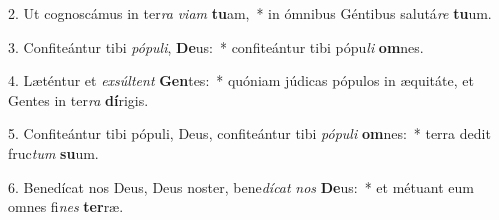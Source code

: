 2. Ut cognoscámus in ter\textit{ra} \textit{vi}\textit{am} \textbf{tu}am,~*  in ómnibus Géntibus salutá\textit{re} \textbf{tu}um.\

3. Confiteántur tibi \textit{pó}\textit{pu}\textit{li}, \textbf{De}us:~*  confiteántur tibi pópu\textit{li} \textbf{om}nes.\

4. Læténtur et \textit{ex}\textit{súl}\textit{tent} \textbf{Gen}tes:~*  quóniam júdicas pópulos in æquitáte, et Gentes in ter\textit{ra} \textbf{dí}rigis.\

5. Confiteántur tibi pópuli, Deus, confiteántur tibi \textit{pó}\textit{pu}\textit{li} \textbf{om}nes:~*  terra dedit fruc\textit{tum} \textbf{su}um.\

6. Benedícat nos Deus, Deus noster, bene\textit{dí}\textit{cat} \textit{nos} \textbf{De}us:~*  et métuant eum omnes fi\textit{nes} \textbf{ter}ræ.\


